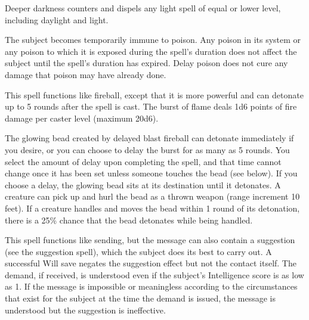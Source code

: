 \begin{multicols}{2}
\begin{small}
\smallskip\noindent Deeper darkness counters and dispels any light spell of equal or lower level, including daylight and light.

\noindent The subject becomes temporarily immune to poison. Any poison in its system or any poison to which it is exposed during the spell's duration does not affect the subject until the spell's duration has expired. Delay poison does not cure any damage that poison may have already done.

\noindent This spell functions like fireball, except that it is more powerful and can detonate up to 5 rounds after the spell is cast. The burst of flame deals 1d6 points of fire damage per caster level (maximum 20d6).

\smallskip\noindent The glowing bead created by delayed blast fireball can detonate immediately if you desire, or you can choose to delay the burst for as many as 5 rounds. You select the amount of delay upon completing the spell, and that time cannot change once it has been set unless someone touches the bead (see below). If you choose a delay, the glowing bead sits at its destination until it detonates. A creature can pick up and hurl the bead as a thrown weapon (range increment 10 feet). If a creature handles and moves the bead within 1 round of its detonation, there is a 25\% chance that the bead detonates while being handled.

\noindent This spell functions like sending, but the message can also contain a suggestion (see the suggestion spell), which the subject does its best to carry out. A successful Will save negates the suggestion effect but not the contact itself. The demand, if received, is understood even if the subject's Intelligence score is as low as 1. If the message is impossible or meaningless according to the circumstances that exist for the subject at the time the demand is issued, the message is understood but the suggestion is ineffective.


\end{small}
\end{multicols}
